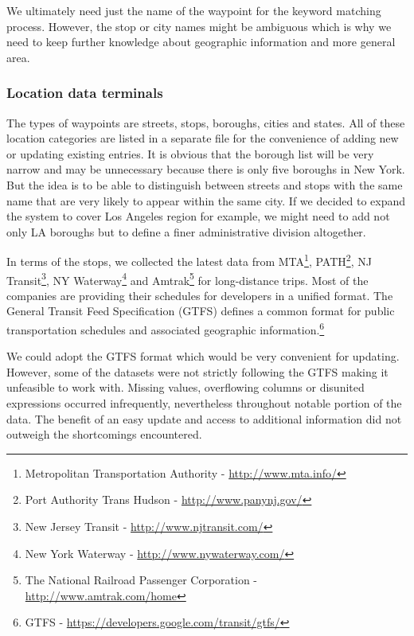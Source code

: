 We ultimately need just the name of the waypoint for the keyword matching process.
However, the stop or city names might be ambiguous which is why we need to keep further knowledge about geographic information and more general area. %

\subsubsection{Location data terminals} \label{sec:terminals}

The types of waypoints are streets, stops, boroughs, cities and states.
All of these location categories are listed in a separate file for the convenience of adding new or updating existing entries.
It is obvious that the borough list will be very narrow and may be unnecessary because there is only five boroughs in New York.
But the idea is to be able to distinguish between streets and stops with the same name that are very likely to appear within the same city.
If we decided to expand the system to cover Los Angeles region for example, we might need to add not only LA boroughs but to define a finer administrative division altogether.

In terms of the stops, we collected the latest data from
MTA\footnote{Metropolitan Transportation Authority - \url{http://www.mta.info/}},
PATH\footnote{Port Authority Trans Hudson - \url{http://www.panynj.gov/}},
NJ Transit\footnote{New Jersey Transit - \url{http://www.njtransit.com/}},
NY Waterway\footnote{New York Waterway - \url{http://www.nywaterway.com/}} and
Amtrak\footnote{The National Railroad Passenger Corporation - \url{http://www.amtrak.com/home}} for long-distance trips.
Most of the companies are providing their schedules for developers in a unified format.
The General Transit Feed Specification (GTFS) defines a common format for public transportation schedules and associated geographic information.\footnote{GTFS - \url{https://developers.google.com/transit/gtfs/}}

We could adopt the GTFS format which would be very convenient for updating.
However, some of the datasets were not strictly following the GTFS making it unfeasible to work with.
Missing values, overflowing columns or disunited expressions occurred infrequently, nevertheless throughout notable portion of the data.
The benefit of an easy update and access to additional information did not outweigh the shortcomings encountered.

